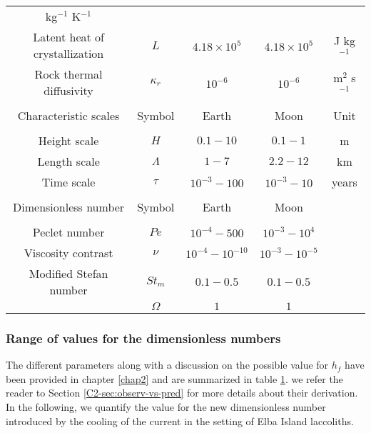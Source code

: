 \begin{table}[h!]
\begin{center}
{\begin{tabular}{c|c|c|c|c}
                                                                      kg$^{-1}$ K$^{-1}$\\
        Latent       heat       of      crystallization&       $L$       &
                                                                           $4.18\times10^5$&$4.18\times10^5$& J kg$^{-1}$\\
        Rock  thermal  diffusivity  &$\kappa_r$& $10^{-6}$  &$10^{-6}$  &
                                                                          m$^{2}$
                                                                          s$^{-1}$\\
                  &&&&\\
        \hline
        Characteristic scales & Symbol & Earth & Moon&Unit\\
        \hline
                  &&&&\\
        Height scale & $H$& $0.1-10$ &$0.1-1$ &m \\
        Length scale & $\Lambda$ & $1-7$&$2.2-12$& km \\
        Time scale & $\tau$ & $10^{-3}-100$&$10^{-3}-10$& years \\
                  &&&&\\
        \hline
        Dimensionless number & Symbol & Earth & Moon&\\
        \hline
                  &&&&\\
        Peclet number &$Pe$& $10^{-4}-500$&$10^{-3}-10^4$ &\\
        Viscosity contrast & $\nu$ & $10^{-4}-10^{-10}$& $10^{-3}-10^{-5}$&\\
        Modified Stefan number & $St_m$ & $0.1-0.5$ &  $0.1-0.5$ &\\
                  &$\Omega$ & $1$ & $1$&
                                         \label{C4-tab2}
      \end{tabular} 
    }
  \end{center}
  \label{C4-tab}
\end{table}

\subsubsection*{Range of values for the dimensionless numbers}
\label{C4-sec:range-valu-dimens}
 
The different parameters along with a discussion on the possible value
for $h_f$ have been provided in chapter \ref{chap2} and are summarized
in   table   \ref{C4-tab}.    we   refer   the   reader   to   Section
\ref{C2-sec:observ-vs-pred} for  more details about  their derivation.
In  the following,  we quantify  the value  for the  new dimensionless
number introduced by the cooling of the current in the setting of Elba
Island laccoliths.

